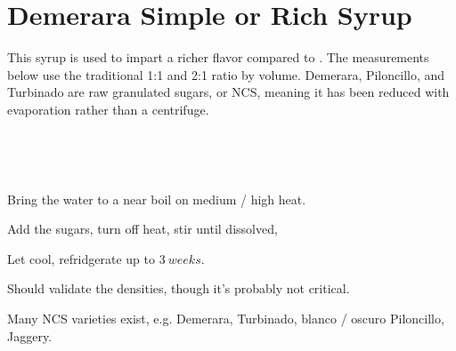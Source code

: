 \section[Demerara Syrup]{Demerara Simple or Rich Syrup}


\begin{recipestats}[
	servings=$\approx~1~Cup$,
	preptime=5~\minute,
	source=Mike \& Jane,
	original=\citefield{cocktailSeminars2021}{title} \cite{cocktailSeminars2021},
]
\end{recipestats}

\begin{recipeabstract}
	This syrup is used to impart a richer flavor compared to .
	The measurements below use the traditional 1:1 and 2:1 ratio by volume.
	Demerara, Piloncillo, and Turbinado are raw granulated sugars, or \gls{NCS},
		meaning it has been reduced with evaporation rather than a centrifuge\cite{worldSugarGuide}.
\end{recipeabstract}

\begin{ingredientcolumns}
	\begin{ingredientblock}[simple]
		\\
	\end{ingredientblock}

	\begin{ingredientblock}[rich]
		\\
	\end{ingredientblock}
\end{ingredientcolumns}


\begin{preparation}
\item Bring the water to a near boil on medium / high heat.
\item Add the sugars, turn off heat, stir until dissolved,
\item Let cool, refridgerate up to $3~weeks$.
\end{preparation}

\begin{experiments}
\item Should validate the densities, though it's probably not critical.
\end{experiments}

\begin{variation}
\item Many \gls{NCS} varieties exist, e.g. Demerara, Turbinado, blanco / oscuro Piloncillo, Jaggery.
\end{variation}


\recipeend
